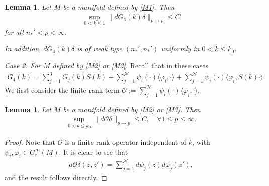 \documentclass[12pt]{amsart}
\newtheorem{lemma}[theorem]{Lemma}
\begin{document}
\begin{lemma}\label{lemma_G4_1}
Let $M$ be a manifold defined by \eqref{M1}. Then
\begin{align}
    \sup_{0<k\le 1}\|dG_4(k)\delta\|_{p\to p} \le C
\end{align} 
for all $n_*'<p<\infty$.

In addition, $d G_4(k) \delta$ is of weak type $(n_*', n_*')$ uniformly in $0<k\le k_0$.
\end{lemma}

\bigskip


\textit{Case 2. For $M$ defined by \eqref{M2} or \eqref{M3}.} Recall that in these cases
\begin{align*}
    G_4(k) = \sum_{j=1}^3 G_j(k)S(k) + \sum_{j=1}^{\mathcal{N}} \psi_i(\cdot) \langle \varphi_i, \cdot\rangle + \sum_{j=1}^{\mathcal{N}} \psi_i(\cdot) \langle \varphi_i, S(k) \cdot \rangle.
\end{align*}
We first consider the finite rank term $\mathcal{O:=}\sum_{j=1}^{\mathcal{N}} \psi_i(\cdot) \langle \varphi_i, \cdot\rangle$.

\begin{lemma}\label{lemma_O}
Let $M$ be a manifold defined by \eqref{M2} or \eqref{M3}. Then
\begin{align*}
    \sup_{0<k\le k_0}\|d\mathcal{O}\delta\|_{p\to p} \le C,\quad \forall 1\le p\le  \infty.
\end{align*}
\end{lemma}

\begin{proof}
Note that $\mathcal{O}$ is a finite rank operator independent of $k$, with $\psi_i,\varphi_i\in C_c^\infty(M)$. It is clear to see that
\begin{align*}
    d\mathcal{O} \delta (z,z') = \sum_{j=1}^{\mathcal{N}} d\psi_j(z) d\varphi_j(z'),
\end{align*}
and the result follows directly.

\end{proof}
\end{document}
